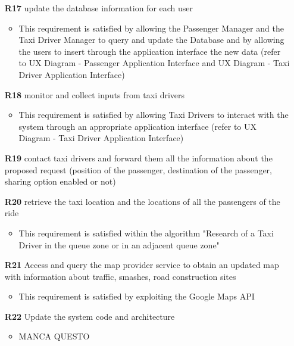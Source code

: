 \begin{itemize}
	\item [\textbf{R17}] update the database information for each user
	\begin{itemize}
		\item This requirement is satisfied by allowing the Passenger Manager and the Taxi Driver Manager to query and update the Database and by allowing the users to insert through the application interface the new data (refer to UX Diagram - Passenger Application Interface and UX Diagram - Taxi Driver Application Interface)
	\end{itemize}

	\item [\textbf{R18}] monitor and collect inputs from taxi drivers
	\begin{itemize}
		\item This requirement is satisfied by allowing Taxi Drivers to interact with the system through an appropriate application interface (refer to UX Diagram - Taxi Driver Application Interface)
	\end{itemize}

	\item [\textbf{R19}] contact taxi drivers and forward them all the information about the proposed request (position of the passenger, destination of the passenger, sharing option enabled or not)
	\item [\textbf{R20}] retrieve the taxi location and the locations of all the passengers of the ride
	\begin{itemize}
		\item This requirement is satisfied within the algorithm "Research of a Taxi Driver in the queue zone or in an adjacent queue zone"
	\end{itemize}
	
	\item [\textbf{R21}] Access and query the map provider service to obtain an updated map with information about traffic, smashes, road construction sites
	\begin{itemize}
		\item This requirement is satisfied by exploiting the Google Maps API
	\end{itemize}
	
	\item [\textbf{R22}] Update the system code and architecture
	\begin{itemize}
		\item MANCA QUESTO
	\end{itemize}
\end{itemize}